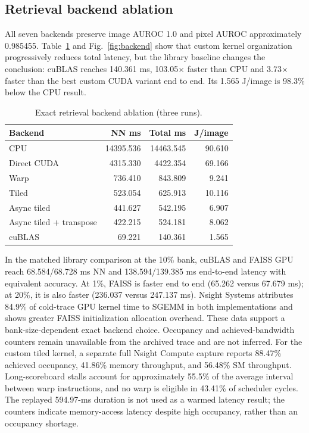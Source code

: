 \documentclass[twocolumn]{svjour3}
\begin{document}
\subsection{Retrieval backend ablation}
All seven backends preserve image AUROC 1.0 and pixel AUROC approximately
0.985455. Table~\ref{tab:backend} and Fig.~\ref{fig:backend} show that custom
kernel organization progressively reduces total latency, but the library
baseline changes the conclusion: cuBLAS reaches 140.361 ms, 103.05$\times$
faster than CPU and 3.73$\times$ faster than the best custom CUDA variant end
to end. Its 1.565 J/image is 98.3\% below the CPU result.

\begin{table}[t]
\caption{Exact retrieval backend ablation (three runs).}\label{tab:backend}
\centering\scriptsize
\begin{tabular}{lrrr}\hline
Backend & NN ms & Total ms & J/image\\\hline
CPU & 14395.536 & 14463.545 & 90.610\\
Direct CUDA & 4315.330 & 4422.354 & 69.166\\
Warp & 736.410 & 843.809 & 9.241\\
Tiled & 523.054 & 625.913 & 10.116\\
Async tiled & 441.627 & 542.195 & 6.907\\
Async tiled + transpose & 422.215 & 524.181 & 8.062\\
cuBLAS & 69.221 & 140.361 & 1.565\\
\hline
\end{tabular}
\end{table}

In the matched library comparison at the 10\% bank, cuBLAS and FAISS GPU reach
68.584/68.728 ms NN and 138.594/139.385 ms end-to-end latency with equivalent
accuracy. At 1\%, FAISS is faster end to end (65.262 versus 67.679 ms); at
20\%, it is also faster (236.037 versus 247.137 ms). Nsight Systems attributes
84.9\% of cold-trace GPU kernel time to SGEMM in both implementations and shows
greater FAISS initialization allocation overhead. These data support a
bank-size-dependent exact backend choice. Occupancy and achieved-bandwidth
counters remain unavailable from the archived trace and are not inferred.
For the custom tiled kernel, a separate full Nsight Compute capture reports
88.47\% achieved occupancy, 41.86\% memory throughput, and 56.48\% SM
throughput. Long-scoreboard stalls account for approximately 55.5\% of the
average interval between warp instructions, and no warp is eligible in 43.41\%
of scheduler cycles. The replayed 594.97-ms duration is not used as a warmed
latency result; the counters indicate memory-access latency despite high
occupancy, rather than an occupancy shortage.
\end{document}
